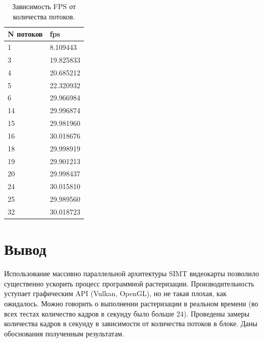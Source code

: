 
\pagebreak

\begin{table}[ph!]
	\centering
	\begin{center}
		\begin{threeparttable}
		\caption{Зависимость FPS от количества потоков. }
		\label{tbl:random}
			\centering
			\begin{tabular}{|l|l|}
				\toprule
				 N потоков &   fps \\
				\midrule
						1 &  8.109443 \\
						3 & 19.825833 \\
						4 & 20.685212 \\
						5 & 22.320932 \\
						6 & 29.966984 \\
					   14 & 29.996874 \\
					   15 & 29.981960 \\
					   16 & 30.018676 \\
					   18 & 29.998919 \\
					   19 & 29.901213 \\
					   20 & 29.998437 \\
					   24 & 30.015810 \\
					   25 & 29.989560 \\
					   32 & 30.018723 \\
				\bottomrule
				\end{tabular}
		\end{threeparttable}
	\end{center}
\end{table}

\pagebreak

\section*{Вывод}

Использование массивно параллельной архитектуры SIMT видеокарты позволило существенно ускорить процесс программной растеризации.
Производительность уступает графическим API (Vulkan, OpenGL), но не такая плохая, как ожидалось.
Можно говорить о выполнении растеризации в реальном времени (во всех тестах количество кадров в секунду было больше 24).
Проведены замеры количества кадров в секунду в зависимости от количества потоков в блоке.
Даны обоснования полученным результатам.
